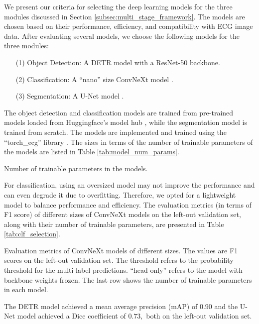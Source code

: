 We present our criteria for selecting the deep learning models for the three modules discussed in Section \ref{subsec:multi_stage_framework}. The models are chosen based on their performance, efficiency, and compatibility with ECG image data. After evaluating several models, we choose the following models for the three modules:
\begin{itemize}
\item[(1)] Object Detection: A DETR model \cite{carion2020DETR} with a ResNet-50 \cite{resnet} backbone.
\item[(2)] Classification: A ``nano'' size ConvNeXt model \cite{Liu_2022_ConvNeXt}.
\item[(3)] Segmentation: A U-Net model \cite{unet}.
\end{itemize}
The object detection and classification models are trained from pre-trained models loaded from Huggingface's model hub \cite{wolf-etal-2020-transformers}, while the segmentation model is trained from scratch. The models are implemented and trained using the ``torch\_ecg'' library \cite{torch_ecg_paper}. The sizes in terms of the number of trainable parameters of the models are listed in Table \ref{tab:model_num_params}.

\begin{table}[!htp]
\centering

\caption{Number of trainable parameters in the models.}
\label{tab:model_num_params}
\end{table}

For classification, using an oversized model may not improve the performance and can even degrade it due to overfitting. Therefore, we opted for a lightweight model to balance performance and efficiency. The evaluation metrics (in terms of F1 score) of different sizes of ConvNeXt models on the left-out validation set, along with their number of trainable parameters, are presented in Table \ref{tab:clf_selection}.

\begin{table}[!htp]
\centering

\caption{Evaluation metrics of ConvNeXt models of different sizes. The values are F1 scores on the left-out validation set. The threshold refers to the probability threshold for the multi-label predictions. ``head only'' refers to the model with backbone weights frozen. The last row shows the number of trainable parameters in each model.}
\label{tab:clf_selection}
\end{table}

The DETR model achieved a mean average precision (mAP) of $0.90$ and the U-Net model achieved a Dice coefficient of $0.73,$ both on the left-out validation set.

